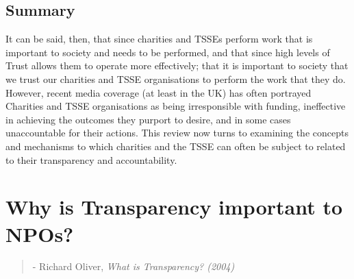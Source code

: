 \subsection{Summary}
It can be said, then, that since charities and TSSEs perform work that is important to society and needs to be performed, and that since high levels of Trust allows them to operate more effectively; that it is important to society that we trust our charities and TSSE organisations to perform the work that they do. However, recent media coverage (at least in the UK) has often portrayed Charities and TSSE organisations as being irresponsible with funding, ineffective in achieving the outcomes they purport to desire, and in some cases unaccountable for their actions. This review now turns to examining the concepts and mechanisms to which charities and the TSSE can often be subject to related to their transparency and accountability.

\section{Why is Transparency important to NPOs?}

%
\begin{quote}
 - Richard Oliver, \textit{What is Transparency? (2004)}
\end{quote}


